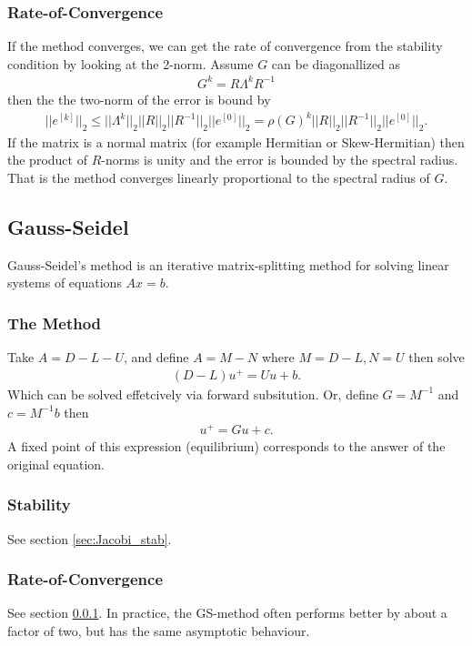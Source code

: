 \subsubsection{Rate-of-Convergence}
\label{sec:Jacobi_conv}
If the method converges, we can get the rate of convergence from the stability condition by looking at the 2-norm.
Assume $G$ can be diagonallized as
\begin{align}
  G^k = R\Lambda^kR^{-1}
\end{align}
then the the two-norm of the error is bound by
\begin{align}
  ||e^{[k]}||_2 \leq ||\Lambda^k||_2||R||_2||R^{-1}||_2||e^{[0]}||_2 = \rho(G)^k ||R||_2||R^{-1}||_2 ||e^{[0]}||_2.
\end{align}
If the matrix is a normal matrix (for example Hermitian or Skew-Hermitian) then the product of $R$-norms is unity and the error is
bounded by the spectral radius. That is the method converges linearly proportional to the spectral radius of $G$.

\subsection{Gauss-Seidel}
Gauss-Seidel's method is an iterative matrix-splitting method for solving linear systems of equations $Ax=b$.
\subsubsection{The Method}
Take $A = D-L-U$, and define $A = M-N$ where $M = D-L, N = U$ then solve
\begin{align}
  (D-L)u^+ =  Uu +b.
\end{align}
Which can be solved effetcively via forward subsitution.
Or, define $G = M^{-1}$ and $c = M^{-1}b$ then
\begin{align}
  u^+ = Gu+c.
\end{align}
A fixed point of this expression (equilibrium) corresponds to the answer of the original equation.
\subsubsection{Stability}
See section \ref{sec:Jacobi_stab}.
\subsubsection{Rate-of-Convergence}
See section \ref{sec:Jacobi_conv}. In practice, the GS-method often performs better by about a factor of two, but has the same asymptotic behaviour.

